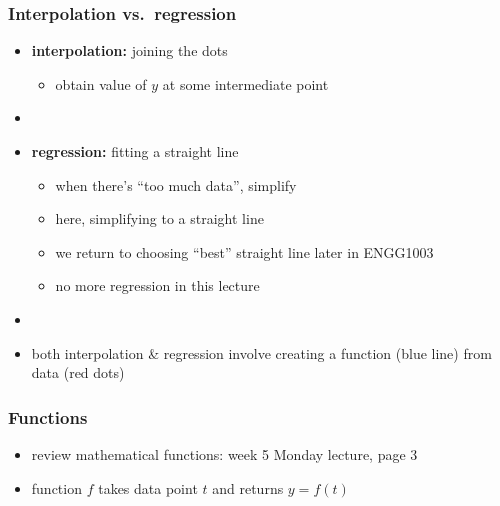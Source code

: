 \documentclass[english,14pt]{beamer}
\newcommand\red[1]{{\color{red} #1}}
\newcommand\blue[1]{{\color{blue} #1}}
\begin{document}

\begin{frame}[fragile]

\frametitle{Interpolation vs.\ regression}

\begin{itemize}
	\item \textbf{interpolation:} joining the dots
	\begin{itemize}
		\item obtain value of $y$ at some intermediate point
	\end{itemize}
	\item[]
	\item \textbf{regression:} fitting a straight line
	\begin{itemize}
		\item when there's ``too much data'', simplify
		\item here, simplifying to a straight line
		\item we return to choosing ``best'' straight line later in ENGG1003
		\item no more regression in this lecture
	\end{itemize}
	\item[]
	\item both interpolation \& regression involve creating a function \blue{(blue line)} from data \red{(red dots)}
\end{itemize}

\end{frame}


\begin{frame}[fragile]

\frametitle{Functions}

\begin{itemize}

	\item review mathematical functions: week 5 Monday lecture, page 3
	\item function $f$ takes data point $t$ and returns $y = f(t)$
\end{itemize}

\end{frame}
\end{document}
